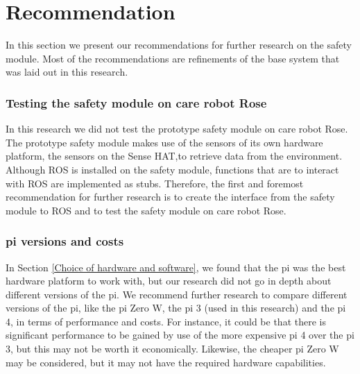 \documentclass[12pt]{scrreprt}
\begin{document}
\newpage
\chapter{Recommendation}
\label{Recommendation}
    
In this section we present our recommendations for further research on the safety module. Most of the recommendations are refinements of the base system that was laid out in this research.

\subsection{Testing the safety module on care robot Rose}
In this research we did not test the prototype safety module on care robot Rose. The prototype safety module makes use of the sensors of its own hardware platform, the sensors on the Sense HAT,to retrieve data from the environment. Although ROS is installed on the safety module, functions that are to interact with ROS are implemented as stubs. Therefore, the first and foremost recommendation for further research is to create the interface from the safety module to ROS and to test the safety module on care robot Rose.

\subsection{\gls{pi} versions and costs}
\label{pi versions and costs}
In Section \ref{Choice of hardware and software}, we found that the \gls{pi} was the best hardware platform to work with, but our research did not go in depth about different versions of the \gls{pi}. We recommend further research to compare different versions of the \gls{pi}, like the \gls{pi} Zero W, the \gls{pi} 3 (used in this research) and the \gls{pi} 4, in terms of performance and costs. For instance, it could be that there is significant performance to be gained by use of the more expensive \gls{pi} 4 over the \gls{pi} 3, but this may not be worth it economically. Likewise, the cheaper \gls{pi} Zero W may be considered, but it may not have the required hardware capabilities.
\end{document}
